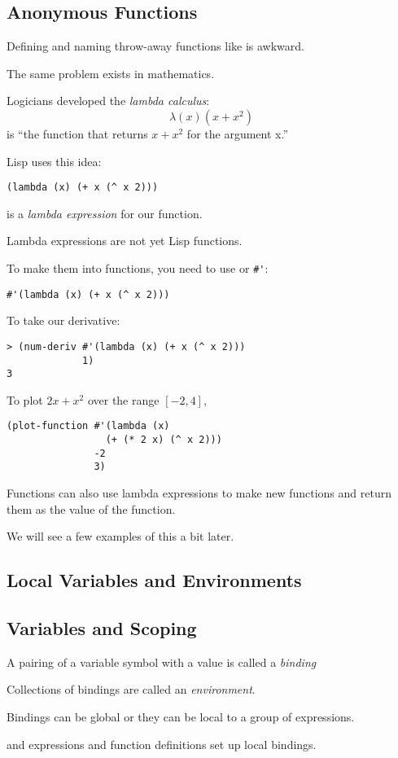 \begin{slide}{}
\subsection{Anonymous Functions}
Defining and naming throw-away functions like  is awkward.

The same problem exists in mathematics.

Logicians developed the {\em lambda calculus}:
\begin{displaymath}
\lambda(x)(x + x^{2})
\end{displaymath}
is ``the function that returns $x + x^{2}$ for the argument x.''

Lisp uses this idea:
{\Large
\begin{verbatim}
(lambda (x) (+ x (^ x 2)))
\end{verbatim}}
is a {\em lambda expression} for our function.
\end{slide}

\begin{slide}{}
Lambda expressions are not yet Lisp functions.

To make them into functions, you need to use  or
\verb+#'+:
{\Large
\begin{verbatim}
#'(lambda (x) (+ x (^ x 2)))
\end{verbatim}}
To take our derivative:
{\Large
\begin{verbatim}
> (num-deriv #'(lambda (x) (+ x (^ x 2)))
             1)
3
\end{verbatim}}
To plot $2x+x^{2}$ over the range $[-2,4]$,
{\Large
\begin{verbatim}
(plot-function #'(lambda (x)
                 (+ (* 2 x) (^ x 2)))
               -2
               3)
\end{verbatim}}

Functions can also use lambda expressions to make new functions and
return them as the value of the function.

We will see a few examples of this a bit later.
\end{slide}

\begin{slide}{}
\section{Local Variables and Environments}
\subsection{Variables and Scoping}
A pairing of a variable symbol with a value is called a {\em binding}

Collections of bindings are called an {\em environment}.

Bindings can be global or they can be local to a group of expressions.

 and  expressions and function definitions
set up local bindings.
\end{slide}

